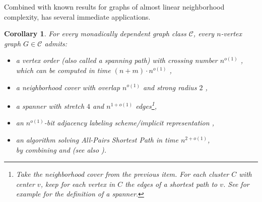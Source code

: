 \documentclass[11pt]{article}
\newtheorem{corollary}[theorem]{Corollary}
\theoremstyle{definition}
\newcommand{\CC}{{\mathscr C}}
\begin{document}
Combined with known results for graphs  of almost linear neighborhood complexity,  has several immediate applications.

\begin{corollary}\label{cor:consequences}
  For every monadically dependent graph class $\CC$, every $n$-vertex graph $G\in\CC$ admits:  
  \begin{itemize}
    \item a vertex order (also called a spanning path) with crossing number $n^{o(1)}$ \cite{Welzl88},\\ which can be computed in time $(n+m)\cdot n^{o(1)}$ \cite{dreier2026nearlineartimecomputationwelzl},
    \item a neighborhood cover with overlap $n^{o(1)}$ and strong radius $2$ \cite{stable_MC},
    \item a spanner with stretch $4$ and $n^{1 + o(1)}$ edges\footnote{Take the neighborhood cover from the previous item. For each cluster $C$ with center $v$, keep for each vertex in $C$ the edges of a shortest path to $v$. See for example \cite{peleg1989spanners} for the definition of a spanner.},
    \item an $n^{o(1)}$-bit adjacency labeling scheme/implicit representation \cite{Alon2023,adj-lab},
    \item an algorithm solving All-Pairs Shortest Path in time $n^{2+o(1)}$, \\by combining  
     \cite[Thm. 6.2]{twwIII} and \cite[Lem. 13]{duraj} (see also \cite[Thm. 11]{bonnet2026fastshortestpathgraphs}).
  \end{itemize}
\end{corollary}
\end{document}
